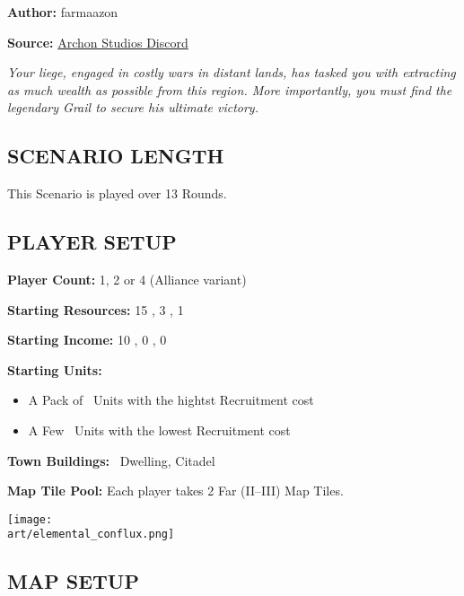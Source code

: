 
\begin{multicols*}{2}

\textbf{Author:} farmaazon

\textbf{Source:} \href{https://discordapp.com/channels/740870068178649108/1344400556717768865/1344400556717768865}{Archon Studios Discord}

\textit{Your liege, engaged in costly wars in distant lands, has tasked you with extracting as much wealth as possible from this region. More importantly, you must find the legendary Grail to secure his ultimate victory.}

\subsection*{\MakeUppercase{Scenario Length}}

This Scenario is played over 13 Rounds.

\subsection*{\MakeUppercase{Player Setup}}

\textbf{Player Count:} 1, 2 or 4 (Alliance variant)

\textbf{Starting Resources:} 15 , 3 , 1 

\textbf{Starting Income:} 10 , 0 , 0 

\textbf{Starting Units:}
\begin{itemize}
  \item A Pack of \bronze\ Units with the hightst Recruitment cost
  \item A Few \silver\ Units with the lowest Recruitment cost
\end{itemize}

\textbf{Town Buildings:} \bronze\ Dwelling, Citadel

\textbf{Map Tile Pool:} Each player takes 2 Far (II--III) Map Tiles.

\begin{center}
  {\texttt{[image: \\art/elemental\_conflux.png]}}
\end{center}

\subsection*{\MakeUppercase{Map Setup}}


\end{multicols*}

